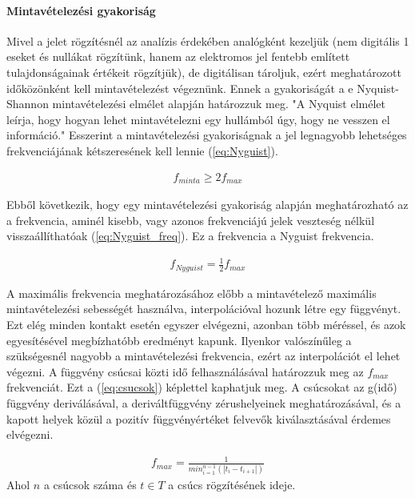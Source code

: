 \paragraph{Mintavételezési gyakoriság}
Mivel a jelet rögzítésnél az analízis érdekében analógként kezeljük (nem digitális 1 eseket és nullákat rögzítünk, hanem az elektromos jel fentebb említett tulajdonságainak értékeit rögzítjük), de digitálisan tároljuk, ezért meghatározott időközönként kell mintavételezést végeznünk. Ennek a gyakoriságát a e Nyquist-Shannon mintavételezési elmélet alapján határozzuk meg. "A Nyquist elmélet leírja, hogy hogyan lehet mintavételezni egy hullámból úgy, hogy ne vesszen el információ."\cite{por2019nyquist} Esszerint a mintavételezési gyakoriságnak a jel legnagyobb lehetséges frekvenciájának kétszeresének kell lennie (\ref{eq:Nyguist})\cite{por2019nyquist}.

\begin{align}
    f_{minta} \geq 2f_{max}
    \label{eq:Nyguist}
\end{align}	
\cite{por2019nyquist}

Ebből következik, hogy egy mintavételezési gyakoriság alapján meghatározható az a frekvencia, aminél kisebb, vagy azonos frekvenciájú jelek veszteség nélkül visszaállíthatóak (\ref{eq:Nyguist_freq}). Ez a frekvencia a Nyguist frekvencia.

\begin{align}
    f_{Nyguist} = \frac{1}{2}f_{max}
    \label{eq:Nyguist_freq}
\end{align}	
\cite{por2019nyquist}

A maximális frekvencia meghatározásához előbb a mintavételező maximális mintavételezési sebességét használva, interpolációval hozunk létre egy függvényt. Ezt elég minden kontakt esetén egyszer elvégezni, azonban több méréssel, és azok egyesítésével megbízhatóbb eredményt kapunk. Ilyenkor valószínűleg a szükségesnél nagyobb a mintavételezési frekvencia, ezért az interpolációt el lehet végezni. A függvény csúcsai közti idő felhasználásával határozzuk meg az $f_{max}$ frekvenciát. Ezt a (\ref{eq:csucsok}) képlettel kaphatjuk meg. A csúcsokat az g(idő) függvény deriválásával, a deriváltfüggvény zérushelyeinek meghatározásával, és a kapott helyek közül a pozitív függvényértéket felvevők kiválasztásával érdemes elvégezni.

\begin{align}
    f_{max} = \frac{1}{min^{n - 1}_{i = 1}(|t_{i} - t_{i + 1}|)}
    \label{eq:csucsok}
\end{align}	
\small Ahol $n$ a csúcsok száma és $t \in T$ a csúcs rögzítésének ideje.

